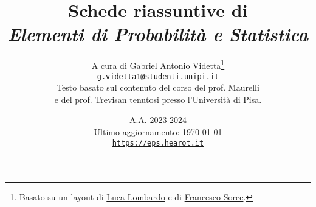 \documentclass[10pt]{report}
\title{\Huge{Schede riassuntive di \\ \textit{Elementi di Probabilità e Statistica}}}
\date{A.A. 2023-2024 \\[0.6in] Ultimo aggiornamento: \today \\[1in] \href{https://eps.hearot.it}{\texttt{https://eps.hearot.it}}}
\author{A cura di Gabriel Antonio Videtta\footnote{Basato su un layout di \underline{Luca Lombardo} e di \underline{Francesco Sorce}.} \\ \href{mailto:g.videtta1@studenti.unipi.it}{\texttt{g.videtta1@studenti.unipi.it}} \\[0.3in] Testo basato sul contenuto del corso del prof. Maurelli \\ e del prof. Trevisan tenutosi presso l'Università di Pisa.}
\begin{document}
\maketitle

\begin{multicols*}{2}
    \tableofcontents
\end{multicols*}

\newpage










\end{document}
